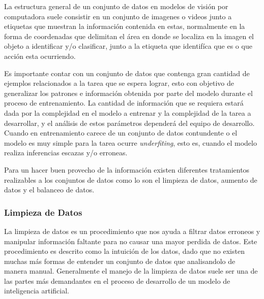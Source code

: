 \documentclass[letter,12pt]{report}
\begin{document}
La estructura general de un conjunto de datos en modelos de visión por computadora suele
consistir en un conjunto de imagenes o videos junto a etiquetas que muestran la
información contenida en estas, normalmente en la forma de coordenadas que delimitan el
área en donde se localiza en la imagen el objeto a identificar y/o clasificar, junto a la
etiqueta que identifíca que es o que acción esta ocurriendo.

Es importante contar con un conjunto de datos que contenga gran cantidad de ejemplos
relacionados a la tarea que se espera lograr, esto con objetivo de generalizar los
patrones e información obtenida por parte del modelo durante el proceso de entrenamiento.
La cantidad de información que se requiera estará dada por la complejidad en el modelo a
entrenar y la complejidad de la tarea a desarrollar, y el análisis de estos parámetros
dependerá del equipo de desarrollo. Cuando en entrenamiento carece de un conjunto de
datos contundente o el modelo es muy simple para la tarea ocurre \textit{underfiting},
esto es, cuando el modelo realiza inferencias escazas y/o erroneas.

Para un hacer buen provecho de la información existen diferentes tratamientos realizables
a los conjuntos de datos como lo son el limpieza de datos, aumento de datos y el balanceo
de datos.

\subsubsection{Limpieza de Datos}
La limpieza de datos es un procedimiento que nos ayuda a filtrar datos erroneos y
manipular información faltante para no causar una mayor perdida de datos\cite{Clean}.
Este procedimiento es descrito como la intuición de los datos, dado que no existen muchas
más formas de entender un conjunto de datos que analisandolo de manera manual.
Generalmente el manejo de la limpieza de datos suele ser una de las partes más
demandantes en el proceso de desarrollo de un modelo de inteligencia artificial.
\end{document}
